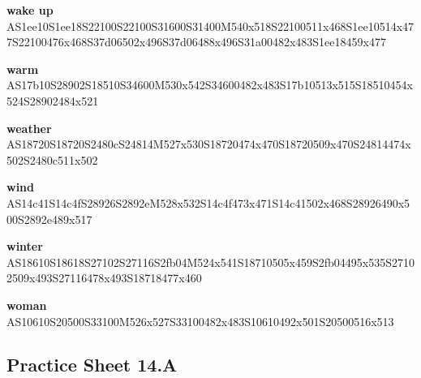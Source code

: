 \documentclass{article}
\begin{document}
\begin{glossary}
\textbf{wake up}\\
AS1ee10S1ee18S22100S22100S31600S31400M540x518S22100511x468S1ee10514x477S22100476x468S37d06502x496S37d06488x496S31a00482x483S1ee18459x477

\textbf{warm}\\
AS17b10S28902S18510S34600M530x542S34600482x483S17b10513x515S18510454x524S28902484x521

\textbf{weather}\\
AS18720S18720S2480cS24814M527x530S18720474x470S18720509x470S24814474x502S2480c511x502

\textbf{wind}\\
AS14c41S14c4fS28926S2892eM528x532S14c4f473x471S14c41502x468S28926490x500S2892e489x517

\textbf{winter}\\
AS18610S18618S27102S27116S2fb04M524x541S18710505x459S2fb04495x535S27102509x493S27116478x493S18718477x460

\textbf{woman}\\
AS10610S20500S33100M526x527S33100482x483S10610492x501S20500516x513

\end{glossary}

\subsection{Practice Sheet 14.A}
\end{document}
